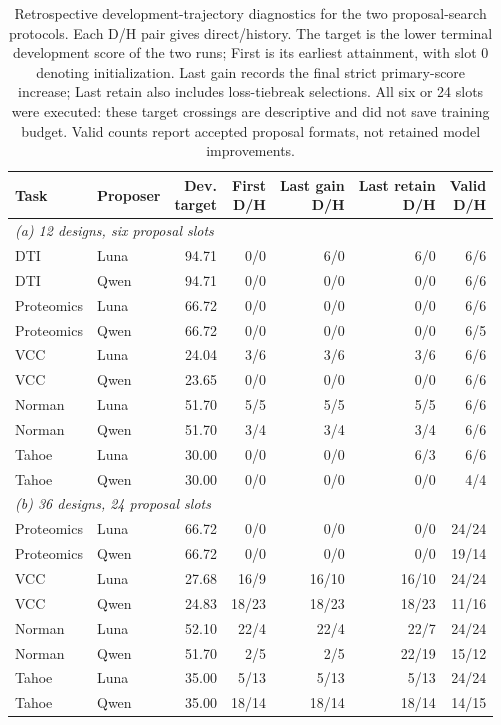 \begin{table}[htbp]
\caption{Retrospective development-trajectory diagnostics for the two proposal-search protocols. Each D/H pair gives direct/history. The target is the lower terminal development score of the two runs; First is its earliest attainment, with slot 0 denoting initialization. Last gain records the final strict primary-score increase; Last retain also includes loss-tiebreak selections. All six or 24 slots were executed: these target crossings are descriptive and did not save training budget. Valid counts report accepted proposal formats, not retained model improvements.}
\label{tab:proposal-dynamics-combined}
\label{tab:completed-dynamics-short6}
\label{tab:completed-dynamics-long24}
\centering\small
\setlength{\tabcolsep}{3pt}
\begin{tabularx}{\linewidth}{@{}Xlrrrrr@{}}
\toprule
Task & Proposer & \shortstack{Dev.\\target} & \shortstack{First\\D/H} & \shortstack{Last gain\\D/H} & \shortstack{Last retain\\D/H} & \shortstack{Valid\\D/H} \\
\midrule
\multicolumn{7}{l}{\textit{(a) 12 designs, six proposal slots}} \\
DTI & Luna & 94.71 & 0/0 & 6/0 & 6/0 & 6/6 \\
DTI & Qwen & 94.71 & 0/0 & 0/0 & 0/0 & 6/6 \\
Proteomics & Luna & 66.72 & 0/0 & 0/0 & 0/0 & 6/6 \\
Proteomics & Qwen & 66.72 & 0/0 & 0/0 & 0/0 & 6/5 \\
VCC & Luna & 24.04 & 3/6 & 3/6 & 3/6 & 6/6 \\
VCC & Qwen & 23.65 & 0/0 & 0/0 & 0/0 & 6/6 \\
Norman & Luna & 51.70 & 5/5 & 5/5 & 5/5 & 6/6 \\
Norman & Qwen & 51.70 & 3/4 & 3/4 & 3/4 & 6/6 \\
Tahoe & Luna & 30.00 & 0/0 & 0/0 & 6/3 & 6/6 \\
Tahoe & Qwen & 30.00 & 0/0 & 0/0 & 0/0 & 4/4 \\
\midrule
\multicolumn{7}{l}{\textit{(b) 36 designs, 24 proposal slots}} \\
Proteomics & Luna & 66.72 & 0/0 & 0/0 & 0/0 & 24/24 \\
Proteomics & Qwen & 66.72 & 0/0 & 0/0 & 0/0 & 19/14 \\
VCC & Luna & 27.68 & 16/9 & 16/10 & 16/10 & 24/24 \\
VCC & Qwen & 24.83 & 18/23 & 18/23 & 18/23 & 11/16 \\
Norman & Luna & 52.10 & 22/4 & 22/4 & 22/7 & 24/24 \\
Norman & Qwen & 51.70 & 2/5 & 2/5 & 22/19 & 15/12 \\
Tahoe & Luna & 35.00 & 5/13 & 5/13 & 5/13 & 24/24 \\
Tahoe & Qwen & 35.00 & 18/14 & 18/14 & 18/14 & 14/15 \\
\bottomrule
\end{tabularx}
\end{table}
